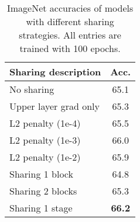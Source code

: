 \begin{table}
\begin{tabular}{l|c}
     \toprule
     Sharing description      & Acc.       \\
     \midrule
      No sharing              & 65.1      \\
      Upper layer grad only   &  65.3     \\
     \midrule
     L2 penalty (1e-4)        & 65.5      \\
     L2 penalty (1e-3)        & 66.0      \\
     L2 penalty (1e-2)        & 65.9      \\
     \midrule
     Sharing 1 block          & 64.8      \\
     Sharing 2 blocks         & 65.3      \\
     Sharing 1 stage          & {\bf 66.2}\\     
     \bottomrule
\end{tabular}
\caption{ImageNet accuracies of models with different sharing strategies. All entries are trained
with 100 epochs.}
\label{tab:ablation_sharing}
\end{table}
\else

